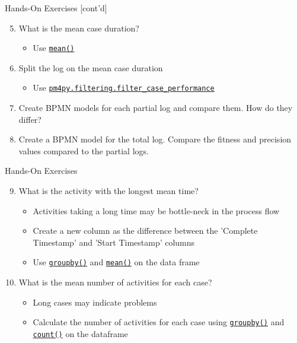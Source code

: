 \documentclass[ignorenonframetext,xcolor=x11names]{beamer}
\begin{document}
\begin{frame}{Hands-On Exercises \small [cont'd]}
\begin{enumerate}
    \setcounter{enumi}{4}
    \item What is the mean case duration? 
    \begin{itemize}
       \item Use \href{https://pandas.pydata.org/docs/reference/api/pandas.DataFrame.mean.html}{\texttt{mean()}}
    \end{itemize}
    \item Split the log on the mean case duration
    \begin{itemize}
       \item Use \href{https://processintelligence.solutions/static/api/2.7.11/generated/pm4py.filtering.filter_case_performance.html}{\texttt{pm4py.filtering.filter\_case\_performance}}
    \end{itemize}
    \item Create BPMN models for each partial log and compare them. How do they differ?
    \item Create a BPMN model for the total log. Compare the fitness and precision values compared to the partial logs.
\end{enumerate}
\end{frame}

\begin{frame}{Hands-On Exercises}
\begin{enumerate}
   \setcounter{enumi}{8}
   \item What is the activity with the longest mean time?
   \begin{itemize}
       \item Activities taking a long time may be bottle-neck in the process flow
       \item Create a new column as the difference between the 'Complete Timestamp' and 'Start Timestamp' columns
       \item Use \href{https://pandas.pydata.org/docs/reference/api/pandas.DataFrame.groupby.html}{\texttt{groupby()}} and \href{https://pandas.pydata.org/docs/reference/api/pandas.DataFrame.mean.html}{\texttt{mean()}} on the data frame
   \end{itemize}
   \item What is the mean number of activities for each case?
   \begin{itemize}
       \item Long cases may indicate problems
       \item Calculate the number of activities for each case using \href{https://pandas.pydata.org/docs/reference/api/pandas.DataFrame.groupby.html}{\texttt{groupby()}} and \href{https://pandas.pydata.org/docs/reference/api/pandas.DataFrame.count.html}{\texttt{count()}} on the dataframe
   \end{itemize}
\end{enumerate}
\end{frame}
\end{document}
